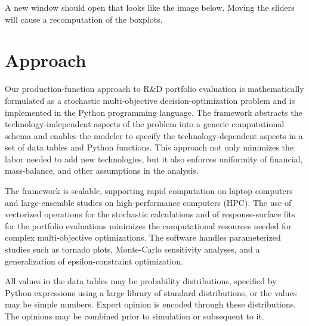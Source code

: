 \documentclass[letterpaper,10pt,english]{sphinxmanual}
\begin{document}
\begin{sphinxVerbatim}[commandchars=\\\{\}]
  
\end{sphinxVerbatim}

A new window should open that looks like the image below. Moving the
sliders will cause a recomputation of the boxplots.

\begin{sphinxVerbatim}[commandchars=\\\{\}]
\end{sphinxVerbatim}

\noindent{}


\chapter{Approach}
\label{\detokenize{approach:approach}}\label{\detokenize{approach:sec-approach}}\label{\detokenize{approach::doc}}
Our production-function approach to R\&D portfolio evaluation is
mathematically formulated as a stochastic multi-objective
decision-optimization problem and is implemented in the Python
programming language. The framework abstracts the technology-independent
aspects of the problem into a generic computational schema and enables
the modeler to specify the technology-dependent aspects in a set of data
tables and Python functions. This approach not only minimizes the labor
needed to add new technologies, but it also enforces uniformity of
financial, mass-balance, and other assumptions in the analysis.

The framework is scalable, supporting rapid computation on laptop
computers and large-ensemble studies on high-performance computers (HPC).
The use of vectorized operations for the stochastic calculations and of
response-surface fits for the portfolio evaluations minimizes the
computational resources needed for complex multi-objective
optimizations. The software handles parameterized studies such as
tornado plots, Monte-Carlo sensitivity analyses, and a generalization of
epsilon-constraint optimization.

All values in the data tables may be probability distributions,
specified by Python expressions using a large library of standard
distributions, or the values may be simple numbers. Expert opinion is
encoded through these distributions. The opinions may be combined prior
to simulation or subsequent to it.
\end{document}
